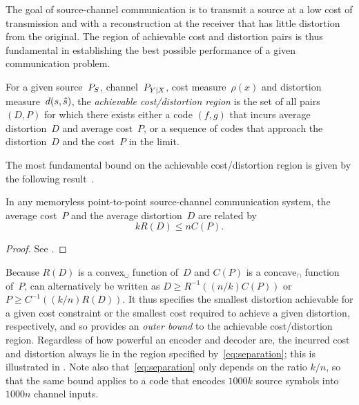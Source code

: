The goal of source-channel communication is to transmit a source at a low cost
of transmission and with a reconstruction at the receiver that has little
distortion from the original. The region of achievable cost and distortion pairs
is thus fundamental in establishing the best possible performance of a given
communication problem.

\begin{definition}
  \label{def:achievableregion}
  For a given source~${P_S}$, channel~$P_{Y|X}$, cost measure~$\rho(x)$ and
  distortion measure~$d(s,{\hat{s}})$, the \emph{achievable cost\slash distortion
  region} is the set of all pairs $(D,P)$ for which there exists either a code
  $(f,g)$ that incurs average distortion~$D$ and average cost~$P$, or a sequence
  of codes that approach the distortion~$D$ and the cost~$P$ in the limit.
\end{definition}

The most fundamental bound on the achievable cost/distortion region is given by
the following result~\cite[Theorem~21]{Shannon1948}.

\begin{theorem}
  \label{thm:separationconverse}
  In any memoryless point-to-point source-channel communication system, the
  average cost~$P$ and the average distortion~$D$ are related by
  \begin{equation}
    \label{eq:separation}
    kR(D) \le nC(P).
  \end{equation}
\end{theorem}

\begin{proof}
  See .
\end{proof}

Because $R(D)$ is a convex$_\cup$ function of~$D$ and $C(P)$ is a concave$_\cap$
function of~$P$,  can alternatively be written as $D
\ge R^{-1}((n/k) C(P))$ or $P \ge C^{-1}((k/n) R(D))$.  It thus specifies the
smallest distortion achievable for a given cost constraint or the smallest cost
required to achieve a given distortion, respectively, and so provides an
\emph{outer bound} to the achievable cost/distortion region.  Regardless of how
powerful an encoder and decoder are, the incurred cost and distortion always lie
in the region specified by~\eqref{eq:separation}; this is illustrated in
. Note also that~\eqref{eq:separation} only depends on
the ratio $k/n$, so that the same bound applies to a code that encodes $1000k$
source symbols into $1000n$ channel inputs. 

